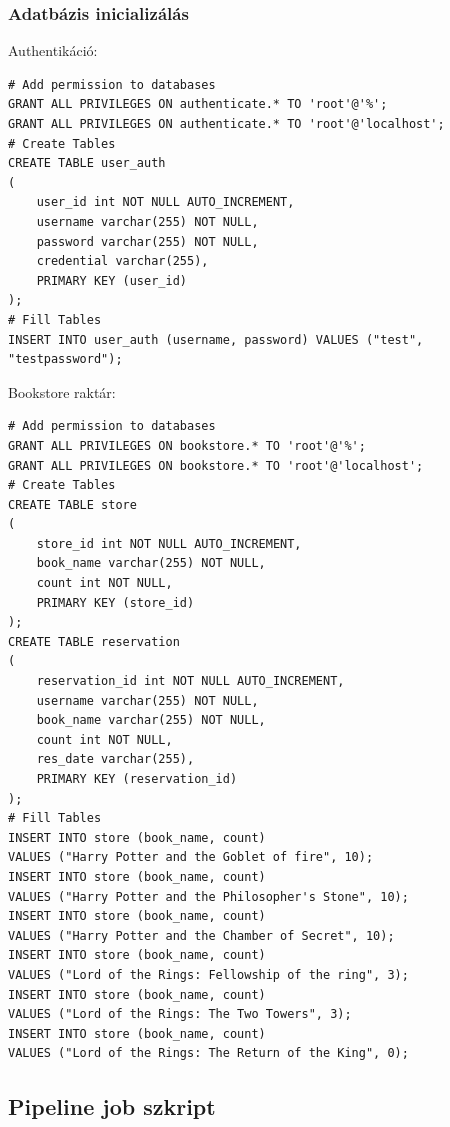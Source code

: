 \documentclass[11pt,magyar,a4paper,twoside,]{report}
\begin{document}
\subsubsection{\texorpdfstring{Adatbázis
inicializálás\label{appendix-database}}{Adatbázis inicializálás}}\label{adatbuxe1zis-inicializuxe1luxe1s}

Authentikáció:

\begin{verbatim}
# Add permission to databases
GRANT ALL PRIVILEGES ON authenticate.* TO 'root'@'%';
GRANT ALL PRIVILEGES ON authenticate.* TO 'root'@'localhost';
# Create Tables
CREATE TABLE user_auth
(
    user_id int NOT NULL AUTO_INCREMENT,
    username varchar(255) NOT NULL,
    password varchar(255) NOT NULL,
    credential varchar(255),
    PRIMARY KEY (user_id)
);
# Fill Tables
INSERT INTO user_auth (username, password) VALUES ("test", "testpassword");
\end{verbatim}

Bookstore raktár:

\begin{verbatim}
# Add permission to databases
GRANT ALL PRIVILEGES ON bookstore.* TO 'root'@'%';
GRANT ALL PRIVILEGES ON bookstore.* TO 'root'@'localhost';
# Create Tables
CREATE TABLE store
(
    store_id int NOT NULL AUTO_INCREMENT,
    book_name varchar(255) NOT NULL,
    count int NOT NULL,
    PRIMARY KEY (store_id)
);
CREATE TABLE reservation
(
    reservation_id int NOT NULL AUTO_INCREMENT,
    username varchar(255) NOT NULL,
    book_name varchar(255) NOT NULL,
    count int NOT NULL,
    res_date varchar(255),
    PRIMARY KEY (reservation_id)
);
# Fill Tables
INSERT INTO store (book_name, count)
VALUES ("Harry Potter and the Goblet of fire", 10);
INSERT INTO store (book_name, count)
VALUES ("Harry Potter and the Philosopher's Stone", 10);
INSERT INTO store (book_name, count)
VALUES ("Harry Potter and the Chamber of Secret", 10);
INSERT INTO store (book_name, count)
VALUES ("Lord of the Rings: Fellowship of the ring", 3);
INSERT INTO store (book_name, count)
VALUES ("Lord of the Rings: The Two Towers", 3);
INSERT INTO store (book_name, count)
VALUES ("Lord of the Rings: The Return of the King", 0);
\end{verbatim}

\subsection{\texorpdfstring{Pipeline job
szkript\label{appendix-pipline}}{Pipeline job szkript}}\label{pipeline-job-szkript}
\end{document}
